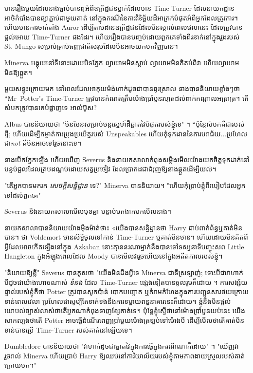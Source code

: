 មានរឿងមួយដែលនាងធ្លាប់បានឮអំពីឧក្រិដ្ឋជនម្នាក់ដែលមាន Time-Turner ដែលនាយកដ្ឋានអាថ៌កំបាំងបានផ្សាភ្ជាប់ជាមួយគាត់ នៅក្នុងករណីនៃការវិនិច្ឆ័យដ៏អាក្រក់បំផុតអំពីអ្នកដែលត្រូវការ។ ហើយមានការចាត់តាំង Auror ដើម្បីតាមដានឧក្រិដ្ឋជនដែលមិនស្គាល់ពេលវេលានេះ ដែលត្រូវបានផ្តល់អោយ Time-Turner ផងដែរ។ ហើយរឿងបានបញ្ចប់ដោយពួកគេទាំងពីរនាក់នៅក្នុងវួដរបស់ St. Mungo សម្រាប់គ្រាប់ធញ្ញជាតិសរុបដែលមិនអាចយកមកវិញបាន។

Minerva អង្គុយនៅទីនោះដោយបិទភ្នែក ព្យាយាមមិនស្តាប់ ព្យាយាមមិនគិតអំពីវា ហើយព្យាយាមមិនឱ្យឆ្កួត។

មួយសន្ទុះក្រោយមក នៅពេលដែលអាគុយម៉ង់ហាក់ដូចជាបានធូរស្រាល នាងបាននិយាយខ្លាំងៗថា “Mr~Potter's Time-Turner ត្រូវបានកំណត់ត្រឹមម៉ោងប្រាំបួន\pm រហូតដល់ពាក់កណ្តាលអធ្រាត្រ។ តើ​សំបក​ត្រូវ​បាន​គេ​បំផ្លាញ​ទេ អាល់ប៊ូស?

Albus បាននិយាយថា "មិនមែនសម្រាប់មន្តស្នេហ៍ដ៏ឆ្លាតវៃបំផុតរបស់ខ្ញុំទេ" ។ “ប៉ុន្តែសំបកគឺជារបស់ថ្មី; ហើយដើម្បីកម្ចាត់ការប្រុងប្រយ័ត្នរបស់ Unspeakables ហើយកុំទុកដាននៃការបរាជ័យ...ប្រហែលជា\emph{not} គឺមិនអាចទៅរួចនោះទេ។

នាងបើកភ្នែកឡើង ហើយឃើញ Severus និងនាយកសាលាកំពុងសម្លឹងមើលយ៉ាងយកចិត្តទុកដាក់នៅបន្ទប់ជួលដែលគ្របដណ្ដប់ដោយសត្វប្រចៀវ ដែលប្រាកដជាជំរុញឱ្យនាងឆ្កួតដើម្បីយល់។

"តើអ្នកបានមករក \emph{សេចក្តីសន្និដ្ឋាន} ទេ?" Minerva បាននិយាយ។ "ហើយកុំប្រាប់ខ្ញុំពីរបៀបដែលអ្នកទៅដល់ពួកគេ"

Severus និងនាយកសាលាមើលមុខគ្នា បន្ទាប់មកងាកមកមើលនាង។

នាយក​សាលា​បាន​និយាយ​យ៉ាង​ម៉ឺងម៉ាត់​ថា​៖ «​យើង​បាន​សន្និដ្ឋាន​ថា Harry ជាប់​ពាក់ព័ន្ធ​ឬ​គាត់​មិន​បាន​។ ថា Voldemort មានសិទ្ធិចូលទៅកាន់ Time-Turner ឬគាត់មិនមាន។ ហើយដោយមិនគិតពីអ្វីដែលអាចកើតឡើងនៅក្នុង Azkaban នោះគ្មាននរណាម្នាក់នឹងបានទៅទស្សនាទីបញ្ចុះសព Little Hangleton ក្នុងអំឡុងពេលដែល Moody បានមើលវារួចហើយនៅក្នុងអតីតកាលរបស់ខ្ញុំ។

"និយាយឱ្យខ្លី" Severus បានគូសថា "យើងមិនដឹងអ្វីទេ Minerva ជាទីស្រឡាញ់; ទោះបីជាវាហាក់បីដូចជាយ៉ាងហោចណាស់ \emph{ទំនង} ដែល Time-Turner ផ្សេងទៀតបានចូលរួមក៏ដោយ ។ ការសង្ស័យផ្ទាល់របស់ខ្ញុំគឺថា Potter ត្រូវបានសូកប៉ាន់ បោកបញ្ឆោត ឬគំរាមកំហែងក្នុងការបញ្ជូនសារថយក្រោយទាន់ពេលវេលា ប្រហែលជាសូម្បីតែទាក់ទងនឹងការទម្លាយពន្ធនាគារនេះក៏ដោយ។ ខ្ញុំ​នឹង​មិន​ផ្តល់​យោបល់​ច្បាស់​លាស់​ថា​តើ​អ្នក​ណា​កំពុង​ទាញ​ខ្សែ​គាត់​ទេ។ ប៉ុន្តែខ្ញុំស្នើថានៅម៉ោងប្រាំបួនយប់នេះ យើងសាកល្បងថាតើ Potter អាចធ្វើដំណើរពេញប្រាំមួយម៉ោងត្រឡប់ទៅម៉ោងបី ដើម្បីមើលថាតើគាត់មិនទាន់បានប្រើ Time-Turner របស់គាត់នៅឡើយទេ។

Dumbledore បាននិយាយថា "វាហាក់ដូចជាឆ្លាតវៃក្នុងការធ្វើក្នុងករណីណាក៏ដោយ" ។ "ឃើញវារួចរាល់ Minerva ហើយប្រាប់ Harry ឱ្យឈប់នៅការិយាល័យរបស់ខ្ញុំតាមភាពងាយស្រួលរបស់គាត់ ក្រោយមក។"

